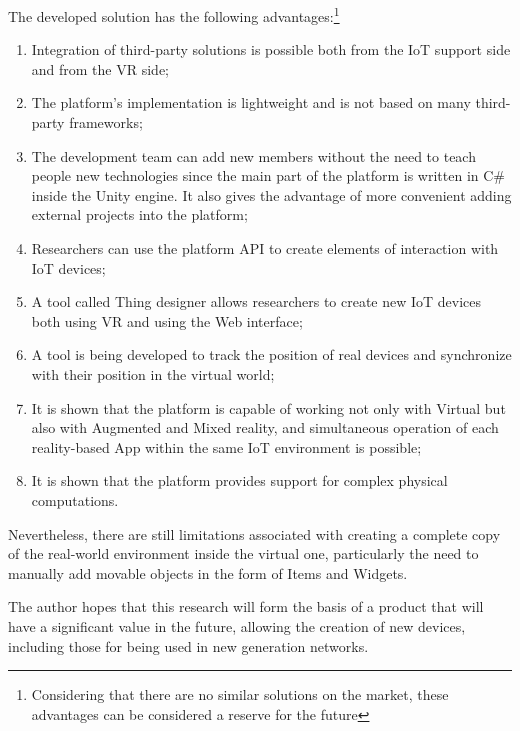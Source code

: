 The developed solution has the following advantages:\footnote{Considering that there are no similar solutions on the market, these advantages can be considered a reserve for the future}
\begin{enumerate}
    \item Integration of third-party solutions is possible both from the IoT support side and from the VR side;
    \item The platform's implementation is lightweight and is not based on many third-party frameworks;
    \item The development team can add new members without the need to teach people new technologies since the main part of the platform is written in C\# inside the Unity engine. It also gives the advantage of more convenient adding external projects into the platform;
    \item Researchers can use the platform API to create elements of interaction with IoT devices;
    \item A tool called Thing designer allows researchers to create new IoT devices both using VR and using the Web interface;
    \item A tool is being developed to track the position of real devices and synchronize with their position in the virtual world;
    \item It is shown that the platform is capable of working not only with Virtual but also with Augmented and Mixed reality, and simultaneous operation of each reality-based App within the same IoT environment is possible;
    \item It is shown that the platform provides support for complex physical computations.
\end{enumerate}

Nevertheless, there are still limitations associated with creating a complete copy of the real-world environment inside the virtual one, particularly the need to manually add movable objects in the form of Items and Widgets.

The author hopes that this research will form the basis of a product that will have a significant value in the future, allowing the creation of new devices, including those for being used in new generation networks.